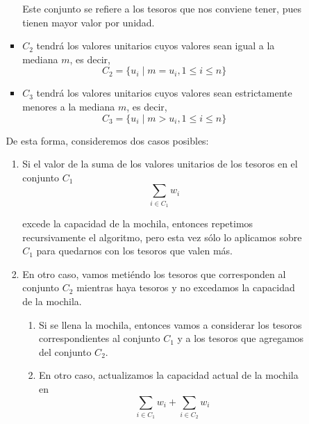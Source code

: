 \documentclass[letterpaper,11pt]{article}
\begin{document}
\begin{enumerate}
\begin{itemize}
\begin{itemize}
\begin{itemize}
                Este conjunto se refiere a los tesoros que nos conviene tener, 
                pues tienen mayor valor por unidad.

                \item $C_2$ tendrá los valores unitarios cuyos valores sean 
                igual a la mediana $m$, es decir, 
                \begin{equation*}
                    C_2 = \{u_i \; | \; m = u_i, 1 \leq i \leq n\}
                \end{equation*}

                \item $C_3$ tendrá los valores unitarios cuyos valores sean 
                estrictamente menores a la mediana $m$, es decir, 
                \begin{equation*}
                    C_3 = \{u_i \; | \; m > u_i, 1 \leq i \leq n\}
                \end{equation*}
            \end{itemize}

            De esta forma, consideremos dos casos posibles:
            \begin{enumerate}
                \item Si el valor de la suma de los valores unitarios de los 
                tesoros en el conjunto $C_1$
                \begin{equation*}
                    \sum_{i \in C_1} w_i
                \end{equation*}

                excede la capacidad de la mochila, entonces repetimos 
                recursivamente el algoritmo, pero esta vez sólo lo aplicamos 
                sobre $C_1$ para quedarnos con los tesoros que valen más.
                
                \item En otro caso, vamos metiéndo los tesoros que corresponden 
                al conjunto $C_2$ mientras haya tesoros y no excedamos la 
                capacidad de la mochila.
                \begin{enumerate}
                    \item Si se llena la mochila, entonces vamos a considerar
                    los tesoros correspondientes al conjunto $C_1$ y a los 
                    tesoros que agregamos del conjunto $C_2$.

                    \item En otro caso, actualizamos la capacidad actual de la 
                    mochila en 
                    \begin{equation*}
                        \sum_{i \in C_1} w_i + \sum_{i \in C_2} w_i
                    \end{equation*}


\end{enumerate}
\end{enumerate}
\end{itemize}
\end{itemize}
\end{enumerate}
\end{document}
